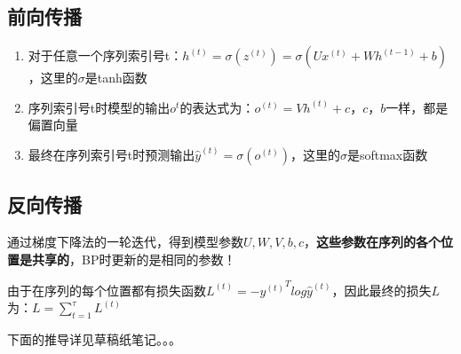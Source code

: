 \documentclass[UTF8]{article}
\begin{document}
    \subsection{前向传播}
    \begin{enumerate}
        \item 对于任意一个序列索引号t：$h^{(t)}=\sigma\left(z^{(t)}\right)=\sigma\left(U x^{(t)}+W h^{(t-1)}+b\right)$，这里的$\sigma$是tanh函数
        \item 序列索引号t时模型的输出$o^{t}$的表达式为：$o^{(t)}=V h^{(t)}+c$，$c，b$一样，都是偏置向量
        \item 最终在序列索引号t时预测输出$\hat{y}^{(t)}=\sigma\left(o^{(t)}\right)$，这里的$\sigma$是softmax函数
    \end{enumerate}

    \subsection{反向传播}
    通过梯度下降法的一轮迭代，得到模型参数$U,W,V,b,c$，\textbf{这些参数在序列的各个位置是共享的}，BP时更新的是相同的参数！

    由于在序列的每个位置都有损失函数$L^{(t)}=-{y^{(t)}}^T log{\hat{y}^{(t)}}$，因此最终的损失$L$为：$L=\sum_{t=1}^{\tau} L^{(t)}$

    下面的推导详见草稿纸笔记。。。
\end{document}
